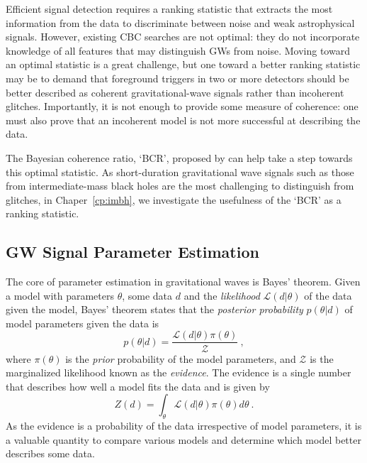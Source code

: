 Efficient signal detection requires a ranking statistic that extracts the most information from the data to discriminate between noise and weak astrophysical signals.  
However, existing CBC searches are not optimal: they do not incorporate knowledge of all features that may distinguish GWs from noise. 
Moving toward an optimal statistic is a great challenge, but one toward a better ranking statistic may be to demand that foreground triggers in two or more detectors should be better described
as coherent gravitational-wave signals rather than incoherent glitches.
Importantly, it is not enough to provide some measure of coherence: one must also prove that an incoherent model is not more successful at
describing the data. 

The Bayesian coherence ratio, `BCR', proposed by \citet{bcr_paper} can help take a step towards this optimal statistic. 
As short-duration gravitational wave signals such as those from intermediate-mass black holes are the most challenging to distinguish from glitches, in Chaper~\ref{cp:imbh}, we investigate the usefulness of the `BCR' as a ranking statistic. 

\subsection{GW Signal Parameter Estimation}

The core of parameter estimation in gravitational waves is Bayes' theorem. 
Given a model with parameters $\theta$, some data $d$ and the \textit{likelihood} $\mathcal{L}(d|\theta)$ of the data given the model, Bayes' theorem states that the \textit{posterior probability} $p(\theta|d)$ of model parameters given the data is 
\begin{equation}
{p(\theta|d)} = \frac{\mathcal{L}(d|\theta)\pi(\theta)}{\mathcal{Z}}\ , \label{eq:bayeTheorem}
\end{equation}
where $\pi(\theta)$ is the \textit{prior} probability of the model parameters, and $\mathcal{Z}$ is the marginalized likelihood known as the
\textit{evidence}. 
The evidence is a single number that describes how well a model fits the data and is given by 
\begin{equation}
Z(d) = \int_\theta \mathcal{L}(d|\theta)\pi(\theta)d\theta\ .
\label{eq:evid}
\end{equation}
As the evidence is a probability of the data irrespective of model parameters, it is a valuable quantity to compare various models and determine which model better describes some data.

